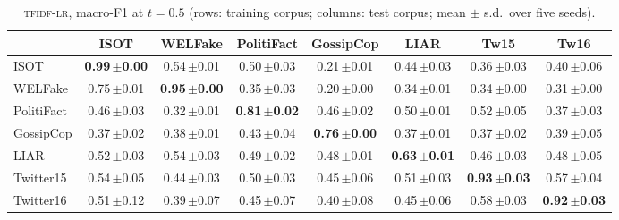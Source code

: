 \begin{table}[h]
\centering
\caption{\textsc{tfidf-lr}, macro-F1 at $t=0.5$ (rows: training corpus; columns: test corpus; mean $\pm$ s.d.\ over five seeds).}
\scriptsize
\begin{tabular}{@{}lccccccc@{}}
\toprule
 & ISOT & WELFake & PolitiFact & GossipCop & LIAR & Tw15 & Tw16 \\
\midrule
ISOT & \textbf{0.99\,{\tiny$\pm$0.00}} & 0.54\,{\tiny$\pm$0.01} & 0.50\,{\tiny$\pm$0.03} & 0.21\,{\tiny$\pm$0.01} & 0.44\,{\tiny$\pm$0.03} & 0.36\,{\tiny$\pm$0.03} & 0.40\,{\tiny$\pm$0.06} \\
WELFake & 0.75\,{\tiny$\pm$0.01} & \textbf{0.95\,{\tiny$\pm$0.00}} & 0.35\,{\tiny$\pm$0.03} & 0.20\,{\tiny$\pm$0.00} & 0.34\,{\tiny$\pm$0.01} & 0.34\,{\tiny$\pm$0.00} & 0.31\,{\tiny$\pm$0.00} \\
PolitiFact & 0.46\,{\tiny$\pm$0.03} & 0.32\,{\tiny$\pm$0.01} & \textbf{0.81\,{\tiny$\pm$0.02}} & 0.46\,{\tiny$\pm$0.02} & 0.50\,{\tiny$\pm$0.01} & 0.52\,{\tiny$\pm$0.05} & 0.37\,{\tiny$\pm$0.03} \\
GossipCop & 0.37\,{\tiny$\pm$0.02} & 0.38\,{\tiny$\pm$0.01} & 0.43\,{\tiny$\pm$0.04} & \textbf{0.76\,{\tiny$\pm$0.00}} & 0.37\,{\tiny$\pm$0.01} & 0.37\,{\tiny$\pm$0.02} & 0.39\,{\tiny$\pm$0.05} \\
LIAR & 0.52\,{\tiny$\pm$0.03} & 0.54\,{\tiny$\pm$0.03} & 0.49\,{\tiny$\pm$0.02} & 0.48\,{\tiny$\pm$0.01} & \textbf{0.63\,{\tiny$\pm$0.01}} & 0.46\,{\tiny$\pm$0.03} & 0.48\,{\tiny$\pm$0.05} \\
Twitter15 & 0.54\,{\tiny$\pm$0.05} & 0.44\,{\tiny$\pm$0.03} & 0.50\,{\tiny$\pm$0.03} & 0.45\,{\tiny$\pm$0.06} & 0.51\,{\tiny$\pm$0.03} & \textbf{0.93\,{\tiny$\pm$0.03}} & 0.57\,{\tiny$\pm$0.04} \\
Twitter16 & 0.51\,{\tiny$\pm$0.12} & 0.39\,{\tiny$\pm$0.07} & 0.45\,{\tiny$\pm$0.07} & 0.40\,{\tiny$\pm$0.08} & 0.45\,{\tiny$\pm$0.06} & 0.58\,{\tiny$\pm$0.03} & \textbf{0.92\,{\tiny$\pm$0.03}} \\
\bottomrule
\end{tabular}
\end{table}

